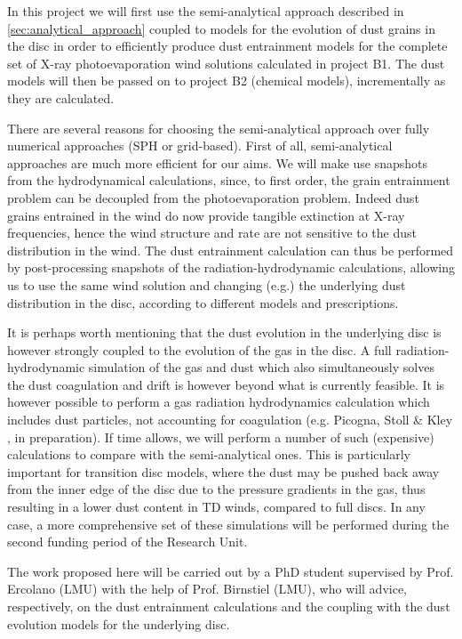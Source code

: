 \documentclass[10pt,fleqn,twoside]{article}
\begin{document}
In this project we will first use the semi-analytical approach described in
\cref{sec:analytical_approach} coupled to models for the
evolution of dust grains in the disc in order to efficiently produce
dust entrainment models for the complete set of X-ray photoevaporation
wind solutions calculated in project B1. The dust models will then be
passed on to project B2 (chemical models), incrementally as they are
calculated. 

There are several reasons for choosing the semi-analytical approach
over fully numerical approaches (SPH or grid-based). First of all,
semi-analytical 
approaches are much more efficient for our aims. We will make
use snapshots from the hydrodynamical calculations, since, to first
order, the grain entrainment problem can be decoupled from the photoevaporation 
problem. Indeed 
dust grains entrained in the wind do now provide tangible extinction
at X-ray frequencies, hence the wind structure and rate are
not sensitive to the dust distribution in the wind. The dust
entrainment calculation can thus be performed by
post-processing snapshots of the radiation-hydrodynamic calculations,
allowing us
to use the same wind solution and changing (e.g.) the underlying dust
distribution in the disc, according to different models and
prescriptions. 

It is perhaps worth mentioning that the dust evolution in the
underlying disc is however strongly coupled to the evolution of the gas
in the disc. A full radiation-hydrodynamic simulation of the gas and
dust which also simultaneously solves the dust coagulation and drift
is however beyond what is currently feasible. It is however possible
to perform a gas radiation hydrodynamics calculation which includes
dust particles, not accounting for coagulation (e.g. Picogna, Stoll \&
Kley ,
in preparation). If time allows, we will perform a number of such
(expensive) calculations to compare with the semi-analytical
ones. This is particularly important for transition disc models, where
the dust may be pushed back away from the inner edge of the disc due
to the pressure gradients in the gas, thus resulting in a  lower dust
content in TD winds, compared to full discs.  In any case, a more
comprehensive set of these simulations will be performed during the
second funding period of the Research Unit.  


The work proposed here will be carried out by a PhD student supervised by
Prof. Ercolano (LMU) with the help of Prof. Birnstiel (LMU), who will
advice, respectively, on the dust entrainment calculations and the 
coupling with the dust evolution models for the underlying disc. 
\end{document}
